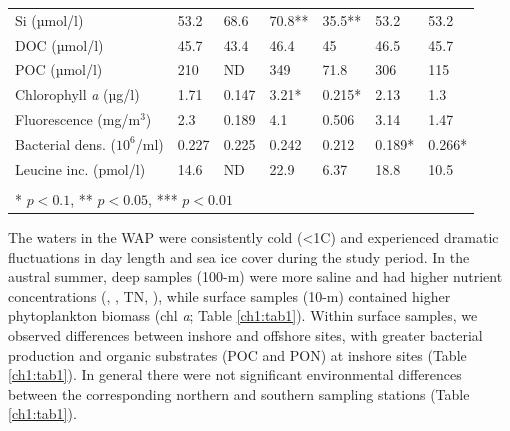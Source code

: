{\begin{landscape}
\begin{table}
\begin{tabular}{@{}lllllll@{}}
Si (µmol/l)                                                  & 53.2              & 68.6               & 70.8**            & 35.5**             & 53.2            & 53.2            \\
DOC (µmol/l)                                                 & 45.7              & 43.4               & 46.4              & 45                 & 46.5            & 45.7            \\
POC (µmol/l)                                                 & 210               & ND                 & 349               & 71.8               & 306             & 115             \\
Chlorophyll \emph{a} (µg/l)                                         & 1.71              & 0.147              & 3.21*             & 0.215*             & 2.13            & 1.3             \\
Fluorescence (mg/m$^3$)                                         & 2.3               & 0.189              & 4.1               & 0.506              & 3.14            & 1.47            \\
Bacterial dens. ($10^6$/ml)                                  & 0.227             & 0.225              & 0.242             & 0.212              & 0.189*          & 0.266*          \\
Leucine inc. (pmol/l)                               & 14.6              & ND                 & 22.9              & 6.37               & 18.8            & 10.5            \\ \midrule
                                                             &                   &                    &                   &                    &                 &                 \\
\multicolumn{7}{l}{* $p < 0.1$, ** $p < 0.05$, *** $p < 0.01$}  
\end{tabular}
\end{table}
\end{landscape}
}

The waters in the WAP were consistently cold (<1\textdegree C) and experienced dramatic fluctuations in day length and sea ice cover during the study period. In the austral summer, deep samples (100-m) were more saline and had higher nutrient concentrations (, , TN, ), while surface samples (10-m) contained higher phytoplankton biomass (chl \textit{a}; Table \ref{ch1:tab1}). Within surface samples, we observed differences between inshore and offshore sites, with greater bacterial production and organic substrates (POC and PON) at inshore sites (Table \ref{ch1:tab1}). In general there were not significant environmental differences between the corresponding northern and southern sampling stations (Table \ref{ch1:tab1}).



